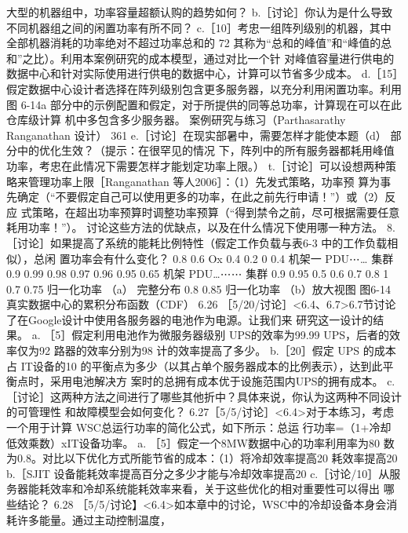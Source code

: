 大型的机器组中，功率容量超额认购的趋势如何？
b.［讨论］你认为是什么导致不同机器组之间的闲置功率有所不同？
c.［10］考忠一组阵列级别的机器，其中全部机器消耗的功率绝对不超过功率总和的 72%
其称为“总和的峰值”和“峰值的总和”之比）。利用本案例研究的成本模型，通过对比一个针
对峰值容量进行供电的数据中心和针对实际使用进行供电的数据中心，计算可以节省多少成本。
d.［15］假定数据中心设计者选择在阵列级别包含更多服务器，以充分利用闲置功率。利用图
6-14a 部分中的示例配置和假定，对于所提供的同等总功率，计算现在可以在此仓库级计算
机中多包含多少服务器。
案例研究与练习（Parthasarathy Ranganathan 设计）
361
e.［讨论］在现实部暑中，需要怎样才能使本题（d） 部分中的优化生效？（提示：在很罕见的情况
下，阵列中的所有服务器都耗用峰值功率，考忠在此情况下需要怎样才能划定功率上限。）
t.［讨论］可以设想两种策略来管理功率上限［Ranganathan 等人2006］：（1）先发式策略，功率预
算为事先确定（“不要假定自己可以使用更多的功率，在此之前先行申请！”）或（2）反应
式策略，在超出功率预算时调整功率预算（“得到禁令之前，尽可根据需要任意耗用功率！”）。
讨论这些方法的优缺点，以及在什么情况下使用哪一种方法。
8.［讨论］如果提高了系统的能耗比例特性（假定工作负载与表6-3 中的工作负载相似），总闲
置功率会有什么变化？
0.8
0.6
Ox
0.4
0.2
0
0.4
机架一
PDU⋯…
集群
0.9
0.99
0.98
0.97
0.96
0.95
0.65
机架
PDU…⋯⋯
集群
0.9
0.95
0.5
0.6
0.7
0.8
1
0.7
0.75
归一化功率
（a） 完整分布
0.8
0.85
归一化功率
（b）放大视图
图6-14 真实数据中心的累积分布函数（CDF）
6.26 ［5/20/讨论］<6.4、6.7>6.7节讨论了在Google设计中使用各服务器的电池作为电源。让我们来
研究这一设计的结果。
a. ［5］假定利用电池作为微服务器级别 UPS的效率为99.99%
UPS，后者的效率仅为92%
路器的效率分别为98%
计的效率提高了多少。
b.［20］假定 UPS 的成本占 IT设备的10%
的平衡点为多少（以其占单个服务器成本的比例表示），达到此平衡点时，采用电池解决方
案时的总拥有成本优于设施范围内UPS的拥有成本。
c.［讨论］这两种方法之间进行了哪些其他折中？具体来说，你认为这两种不同设计的可管理性
和故障模型会如何变化？
6.27［5/5/讨论］<6.4>对于本练习，考虑一个用于计算 WSC总运行功率的简化公式，如下所示：总运
行功率=（1+冷却低效乘数）xIT设备功率。
a. ［5］假定一个8MW数据中心的功率利用率为80%
数为0.8。对比以下优化方式所能节省的成本：（1）将冷却效率提高20%
耗效率提高20%
b.［SJIT 设备能耗效率提高百分之多少才能与冷却效率提高20%
c.［讨论/10］从服务器能耗效率和冷却系统能耗效率来看，关于这些优化的相对重要性可以得出
哪些结论？
6.28 ［5/5/讨论】<6.4>如本章中的讨论，WSC中的冷却设备本身会消耗许多能量。通过主动控制温度，
